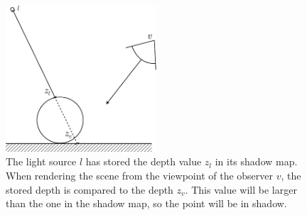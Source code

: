 \begin{figure}[h]
	\centering
	\includegraphics[width=0.5\textwidth]{./graf/shadow_mapping_basic.pdf}
	\caption{The light source \(l\) has stored the depth value \(z_l\) in its shadow map. When rendering the scene from the viewpoint of the observer \(v\), the stored depth is compared to the depth \(z_v\). This value will be larger than the one in the shadow map, so the point will be in shadow.}
	\label{fig:shadow_map_basic}
\end{figure}

